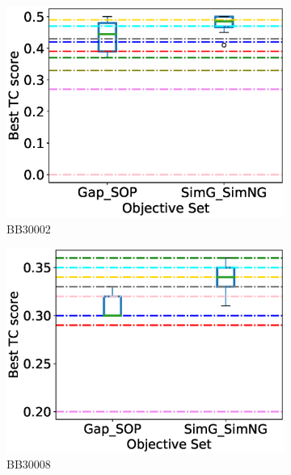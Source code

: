 \begin{figure}[!htbp]
\begin{adjustwidth}{-1cm}{-1cm}
\begin{subfigure}{0.22\textwidth}
			\includegraphics[width=\columnwidth]{Figure/summary/precomputedInit/Balibase/BB30002_objset_tc_rank_2}
			\caption{BB30002}
		\end{subfigure}	
		\begin{subfigure}{0.22\textwidth}
			\includegraphics[width=\columnwidth]{Figure/summary/precomputedInit/Balibase/BB30008_objset_tc_rank_2}
			\caption{BB30008}
		\end{subfigure}
		\begin{subfigure}{0.22\textwidth}

\end{subfigure}
\end{adjustwidth}
\end{figure}
